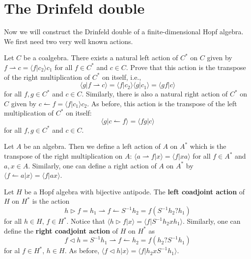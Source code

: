 \section{The Drinfeld double}

Now we will construct the Drinfeld double of a finite-dimensional Hopf algebra.
We first need two very well known actions.

\begin{exercise}
Let $C$ be a coalgebra. There exists a natural left action of $C^*$ on $C$
given by $f\rightharpoonup c=\langle f|c_2\rangle c_1$ for all $f\in C^*$ and
$c\in C$. Prove that this action is the transpose of the right
multiplication of $C^*$ on itself, i.e., 
\[
\langle g|f\rightharpoonup c\rangle=\langle f|c_2\rangle\langle g|c_1\rangle=\langle gf|c\rangle
\]
for all $f,g\in C^*$ and $c\in C$. 
Similarly, there is also a natural right action of $C^*$ on $C$ given by
$c \leftharpoonup f=\langle f|c_1\rangle c_2$.  As before, this action is the
transpose of the left multiplication of $C^*$ on itself: 
\[
\langle g|c\leftharpoonup f\rangle=\langle fg|c\rangle
\] 
for all $f,g\in C^*$ and $c\in C$.
\end{exercise}

\begin{exercise}
Let $A$ be an algebra. Then we define a left action of $A$ on $A^*$ which is
the transpose of the right multiplication on $A$: $\langle a\rightharpoonup
f|x\rangle=\langle f|xa\rangle$ for all $f\in A^*$ and $a,x\in A$. 
Similarly, one can define a right action of $A$ on $A^*$ by $\langle
f\leftharpoonup a|x\rangle = \langle f|ax\rangle$.
\end{exercise}

Let $H$ be a Hopf algebra with bijective antipode. The \textbf{left
coadjoint action} of $H$ on $H^*$ is the action 
\[
h\triangleright f=h_1\rightharpoonup f\leftharpoonup S^{-1}h_2=f(S^{-1}h_2?h_1)
\]
for all $h\in H$, $f\in H^*$. Notice that $\langle h\triangleright
f|x\rangle=\langle f|S^{-1}h_2xh_1\rangle$. Similarly, one can define the
\textbf{right coadjoint action} of $H$ on $H^*$ as 
\[
f\triangleleft h=S^{-1}h_1\rightharpoonup f\leftharpoonup h_2=f(h_2?S^{-1}h_1)
\]
for al $f\in H^*$, $h\in H$. As before, $\langle f\triangleleft h|x\rangle=\langle f|h_2xS^{-1}h_1\rangle$.

